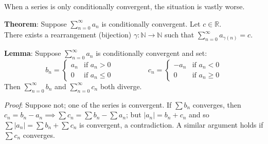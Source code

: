 \documentclass[11pt]{article}
\begin{document}
When a series is only conditionally convergent, the situation is vastly worse.

\textbf{Theorem}: Suppose $\sum_{n=0}^\infty a_n$ is conditionally convergent. Let $c \in \mathbb{R}$.\\
There exists a rearrangement (bijection) $\gamma : \mathbb{N} \to \mathbb{N}$ such that $\sum_{n=0}^\infty a_{\gamma(n)} = c$.

\textbf{Lemma}: Suppose $\sum_{n=0}^\infty a_n$ is conditionally convergent and set:
\[
 b_n =
  \begin{cases}
   a_n & \text{if } a_n > 0\\
   0 & \text{if } a_n \leq 0
  \end{cases}\hspace{2cm}
 c_n =
  \begin{cases}
   -a_n & \text{if } a_n < 0\\
   0 & \text{if } a_n \geq 0
  \end{cases}
\]
Then $\sum_{n=0}^\infty b_n$ and $\sum_{n=0}^\infty c_n$ both diverge.

\emph{Proof}: Suppose not; one of the series is convergent. If $\sum b_n$ converges, then $c_n = b_n - a_n \implies \sum c_n = \sum b_n - \sum a_n$; but $|a_n| = b_n + c_n$ and so $\sum |a_n| = \sum b_n + \sum c_n$ is convergent, a contradiction. A similar argument holds if $\sum c_n$ converges.
\end{document}
